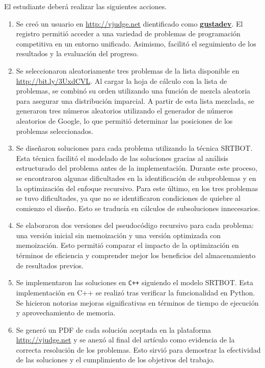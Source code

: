 \documentclass[a4paper, 12pt]{article}
\begin{document}
El estudiante deberá realizar las siguientes acciones.
\begin{enumerate}
  \item
        Se creó un usuario en \href{http://vjudge.net}{http://vjudge.net} dientificado como \textbf{\href{http://vjudge.net/user/gustadev}{gustadev}}. El registro permitió acceder a una variedad de problemas de programación competitiva en un entorno unificado. Asimismo, facilitó el seguimiento de los resultados y la evaluación del progreso.
  \item
        Se seleccionaron aleatoriamente tres problemas de la lista disponible en
        \url{http://bit.ly/3UxdCVL}. Al cargar la hoja de cálculo con la lista de problemas, se combinó su orden utilizando una función de mezcla aleatoria para asegurar una distribución imparcial. A partir de esta lista mezclada, se generaron tres números aleatorios utilizando el generador de números aleatorios de Google, lo que permitió determinar las posiciones de los problemas seleccionados.
  \item
        Se diseñaron soluciones para cada problema utilizando la técnica SRTBOT. Esta técnica facilitó el modelado de las soluciones gracias al análisis estructurado del problema antes de la implementación. Durante este proceso, se encontraron algunas dificultades en la identificación de subproblemas y en la optimización del enfoque recursivo. Para este último, en los tres problemas se tuvo dificultades, ya que no se identificaron condiciones de quiebre al comienzo el diseño. Esto se traducía en cálculos de subsoluciones innecesarios.
  \item
        Se elaboraron dos versiones del pseudocódigo recursivo para cada problema: una versión inicial sin memoización y una versión optimizada con memoización. Esto permitió comparar el impacto de la optimización en términos de eficiencia y comprender mejor los beneficios del almacenamiento de resultados previos.
  \item
        Se implementaron las soluciones en \texttt{C++} siguiendo el modelo SRTBOT. Esta implementación en C++ se realizó tras verificar la funcionalidad en Python. Se hicieron notorias mejoras significativas en términos de tiempo de ejecución y aprovechamiento de memoria.
  \item
        Se generó un PDF de cada solución aceptada en la plataforma \href{http://vjudge.net}{http://vjudge.net} y se anexó al final del artículo como evidencia de la correcta resolución de los problemas. Esto sirvió para demostrar la efectividad de las soluciones y el cumplimiento de los objetivos del trabajo.
\end{enumerate}
\end{document}
